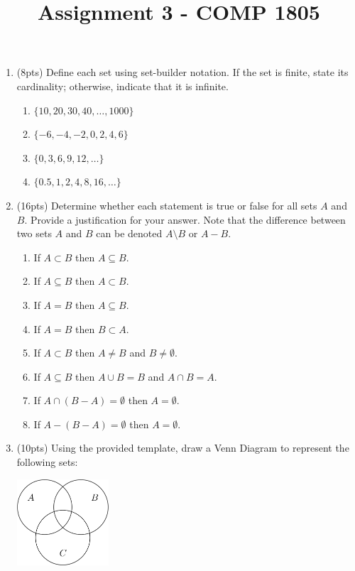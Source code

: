 \documentclass{article}
\begin{document}

\title{Assignment 3 - COMP 1805}
\date{} %
\maketitle
\thispagestyle{fancy}



\medskip
\begin{enumerate}



\item(8pts) Define each set using set-builder notation. If the set is finite, state its cardinality; otherwise, indicate that it is infinite.

\begin{enumerate}
\item $\{ 10, 20, 30, 40,  \ldots, 1000 \}$
\item $\{ -6, -4, -2, 0, 2, 4, 6 \}$
\item $\{ 0,3,6,9,12, \ldots \}$
\item $\{ 0.5, 1, 2, 4, 8, 16, \ldots \}$
\end{enumerate}




\item(16pts) Determine whether each statement is true or false for all sets $A$ and $B$. Provide a justification for your answer. Note that the difference between two sets $A$ and $B$ can be denoted $A \setminus B$ or $A - B$. 

\begin{enumerate}
\item If $A \subset B$ then $A \subseteq B$.
\item If $A \subseteq B$ then $A \subset B$.
\item If $A = B$ then $A \subseteq B$.
\item If $A = B$ then $B \subset A$.
\item If $A \subset B$ then $A \neq B$ and $B \neq \emptyset$.
\item If $A \subseteq B$ then $A \cup B = B$ and $A \cap B = A$.
\item If $A \cap (B - A) = \emptyset$ then $A = \emptyset$.
\item If $A - (B - A) = \emptyset$ then $A = \emptyset$.
\end{enumerate}
 



\item(10pts) Using the provided template, draw a Venn Diagram to represent the following sets:\\
\begin{center}
\includegraphics[width = 0.27\textwidth]{template.png}
\end{center}


\end{enumerate}
\end{document}
